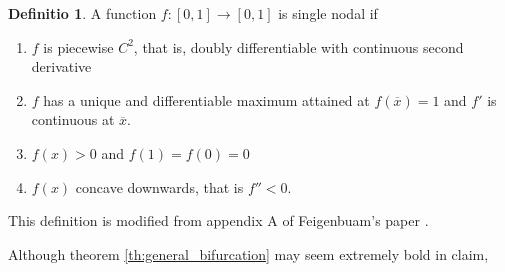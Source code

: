 \documentclass{report}
\theoremstyle{definition}
\newtheorem{defn}[thm]{Definitio}
\theoremstyle{definition}
\theoremstyle{remark}
\newcommand{\mx}{\overline{x}}
\begin{document}
\begin{defn}
	A function $f: [0,1] \rightarrow [0,1]$ is single nodal if 
	\begin{enumerate}
		\item $f$ is piecewise $C^2$, that is, doubly differentiable with continuous second derivative
		\item $f$ has a unique and differentiable maximum attained at $f(\mx) = 1$ and $f'$ is continuous at $\mx$.
		\item $f(x) > 0$ and $f(1) = f(0) =0$
		\item $f(x)$ concave downwards, that is $f'' < 0$.
	\end{enumerate}

	This definition is modified from appendix A of Feigenbuam's paper \cite{F1}.
\end{defn}

Although theorem \ref{th:general_bifurcation} may seem extremely bold in claim, 

\printbibliography
\end{document}
